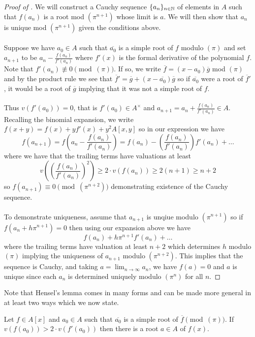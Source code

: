 \begin{proof}[Proof of ]
  We will construct a Cauchy sequence $\{a_{n}\}_{n\in\mathbb{N}}$ of elements in $A$ such that $f(a_{n})$ is a root mod $(\pi^{n+1})$ whose limit is $a$. We will then show that $a_{n}$ is unique mod $(\pi^{n+1})$ given the conditions above. 
  \\\\
  Suppose we have $a_{0}\in A$ such that $\overline{a_{0}}$ is a simple root of $f$ modulo $(\pi)$ and set $a_{n+1}$ to be $a_{n}-\frac{f(a_{n})}{f'(a_{n})}$ where $f'(x)$ is the formal derivative of the polynomial $f$. Note that $f'(a_{n})\not\equiv0\pmod{(\pi)}$. If so, we write $\overline{f}=(x-a_{0})\overline{g}$ mod $(\pi)$ and by the product rule we see that $\overline{f}'=\overline{g}+(x-\overline{a_{0}})\overline{g}$ so if $\overline{a_{0}}$ were a root of $\overline{f}'$, it would be a root of $\overline{g}$ implying that it was not a simple root of $f$. 
  \\\\
  Thus $v(f'(a_{0}))=0$, that is $f'(a_{0})\in A^{\times}$ and $a_{n+1}=a_{n}+\frac{f(a_{n})}{f'(a_{n})}\in A$. Recalling the binomial expansion, we write $f(x+y)=f(x)+y f'(x)+y^{2}A[x,y]$ so in our expression we have 
  $$f(a_{n+1})=f\left(a_{n}-\frac{f(a_{n})}{f'(a_{n})}\right)=f(a_{n})-\left(\frac{f(a_{n})}{f'(a_{n})}\right)f'(a_{n})+\dots$$
  where we have that the trailing terms have valuations at least 
  $$v\left(\left(\frac{f(a_{n})}{f'(a_{n})}\right)^{2}\right)\geq 2\cdot v(f(a_{n}))\geq 2(n+1)\geq n+2$$
  so $f(a_{n+1})\equiv 0\pmod{(\pi^{n+2})}$ demonstrating existence of the Cauchy sequence. 
  \\\\
  To demonstrate uniqueness, assume that $a_{n+1}$ is unqiue modulo $(\pi^{n+1})$ so if $f(a_{n}+h\pi^{n+1})=0$ then using our expansion above we have 
  $$f(a_{n})+h\pi^{n+1}f'(a_{n})+\dots$$
  where the trailing terms have valuation at least $n+2$ which determines $h$ modulo $(\pi)$ implying the uniqueness of $a_{n+1}$ modulo $(\pi^{n+2})$. This implies that the sequence is Cauchy, and taking $a=\lim_{n\to\infty}a_{n}$, we have $f(a)=0$ and $a$ is unique since each $a_{n}$ is determined uniquely modulo $(\pi^{n})$ for all $n$. 
\end{proof}
Note that Hensel's lemma comes in many forms and can be made more general in at least two ways which we now state. 
\begin{lemma}[Hensel, II]\label{lem: Hensel II}
  Let $f\in A[x]$ and $a_{0}\in A$ such that $\overline{a_{0}}$ is a simple root of $\overline{f}\pmod{(\pi)}$. If $v(f(a_{0}))>2\cdot v(f'(a_{0}))$ then there is a root $a\in A$ of $f(x)$. 
\end{lemma}
